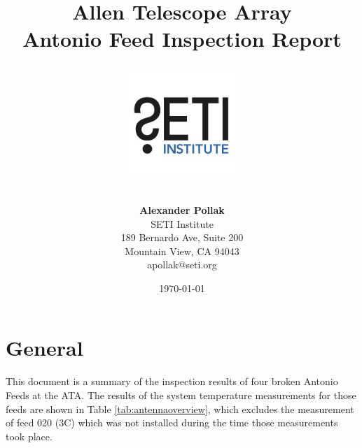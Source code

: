 \documentclass[12pt,a4paper,oneside]{article}
\title{\Huge Allen Telescope Array\\
\vspace{0.5cm}
Antonio Feed Inspection Report\\
\vspace{0.5cm}
\normalsize \emph{}
\vspace{3.5cm}
\begin{center}
\includegraphics[height=4cm]{titlepage/SETI_institute_logo.jpg}
\end{center}
}
\author{ 
\vspace{1cm}
\Large
\textbf{ Alexander Pollak} \\
SETI Institute \\ 
189 Bernardo Ave, Suite 200 \\
Mountain View, CA 94043 \\ 
apollak@seti.org\\
}
\date{\today}
\begin{document}
\clearpage\maketitle
\thispagestyle{empty}

%



%

\newpage
\thispagestyle{empty}
\tableofcontents


\section{General}
\label{sec:1}

This document is a summary of the inspection results of four broken Antonio Feeds at the ATA. The results of the system temperature measurements for those feeds are shown in Table \ref{tab:antennaoverview}, which excludes the measurement of feed 020 (3C) which was not installed during the time those measurements took place.
\end{document}
